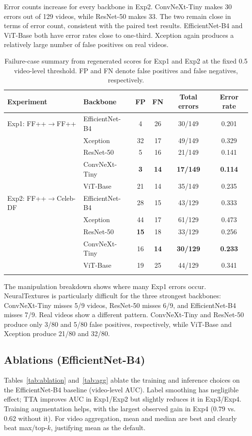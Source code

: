 Error counts increase for every backbone in Exp2. ConvNeXt-Tiny makes 30 errors out of 129 videos, while ResNet-50 makes 33. The two remain close in terms of error count, consistent with the paired test results. EfficientNet-B4 and ViT-Base both have error rates close to one-third. Xception again produces a relatively large number of false positives on real videos.


\begin{table}[!htbp]
\caption{Failure-case summary from regenerated scores for Exp1 and Exp2 at the fixed 0.5 video-level threshold. FP and FN denote false positives and false negatives, respectively.}
\centering
\small
\setlength{\tabcolsep}{3pt}
\begin{tabular}{l l c c c c}
\toprule
\textbf{Experiment} & \textbf{Backbone} & \textbf{FP} & \textbf{FN} & \textbf{Total errors} & \textbf{Error rate} \\
\midrule
Exp1: FF++$\to$FF++ & EfficientNet-B4 & 4 & 26 & 30/149 & 0.201 \\
 & Xception & 32 & 17 & 49/149 & 0.329 \\
 & ResNet-50 & 5 & 16 & 21/149 & 0.141 \\
 & ConvNeXt-Tiny & \textbf{3} & \textbf{14} & \textbf{17/149} & \textbf{0.114} \\
 & ViT-Base & 21 & 14 & 35/149 & 0.235 \\
\midrule
Exp2: FF++$\to$Celeb-DF & EfficientNet-B4 & 28 & 15 & 43/129 & 0.333 \\
 & Xception & 44 & 17 & 61/129 & 0.473 \\
 & ResNet-50 & \textbf{15} & 18 & 33/129 & 0.256 \\
 & ConvNeXt-Tiny & 16 & \textbf{14} & \textbf{30/129} & \textbf{0.233} \\
 & ViT-Base & 19 & 25 & 44/129 & 0.341 \\
\botrule
\end{tabular}
\label{tab:error_deep_dive}
\end{table}

The manipulation breakdown shows where many Exp1 errors occur. NeuralTextures is particularly difficult for the three strongest backbones: ConvNeXt-Tiny misses 5/9 videos, ResNet-50 misses 6/9, and EfficientNet-B4 misses 7/9. Real videos show a different pattern. ConvNeXt-Tiny and ResNet-50 produce only 3/80 and 5/80 false positives, respectively, while ViT-Base and Xception produce 21/80 and 32/80.

\subsection{Ablations (EfficientNet-B4)}
Tables~\ref{tab:ablation} and~\ref{tab:agg} ablate the training and inference choices on the EfficientNet-B4 baseline (video-level AUC). Label smoothing has negligible effect; TTA improves AUC in Exp1/Exp2 but slightly reduces it in Exp3/Exp4. Training augmentation helps, with the largest observed gain in Exp4 ($0.79$ vs.\ $0.62$ without it). For video aggregation, mean and median are best and clearly beat max/top-$k$, justifying mean as the default.

